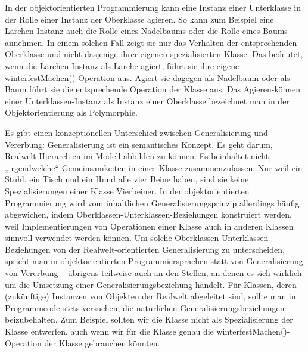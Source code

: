 \vspace{1mm} %

In der objektorientierten Programmierung kann eine Instanz einer Unterklasse in der Rolle einer Instanz der Oberklasse agieren.  So kann zum Beispiel eine Lärchen-Instanz auch die Rolle eines Nadelbaums oder die Rolle eines Baums annehmen. In einem solchen Fall zeigt sie nur das Verhalten der entsprechenden Oberklasse und nicht dasjenige ihrer eigenen spezialisierten Klasse. Das bedeutet, wenn die Lärchen-Instanz als Lärche agiert, führt sie ihre eigene winterfestMachen()-Operation aus. Agiert sie dagegen als Nadelbaum oder als Baum führt sie die entsprechende Operation der Klasse  aus. Das Agieren-können einer Unterklassen-Instanz als Instanz einer Oberklasse bezeichnet man in der Objektorientierung als Polymorphie. 

\vspace{1mm} %

Es gibt einen konzeptionellen Unterschied zwischen Generalisierung und Vererbung: Generalisierung ist ein semantisches Konzept.  Es geht darum, Realwelt-Hierarchien im Modell abbilden zu können. Es beinhaltet nicht, „irgendwelche“ Gemeinsamkeiten in einer Klasse zusammenzufassen. Nur weil ein Stuhl, ein Tisch und ein Hund alle vier Beine haben, sind sie keine Spezialisierungen einer Klasse Vierbeiner. In der objektorientierten Programmierung wird vom inhaltlichen Generalisierungsprinzip allerdings häufig abgewichen, indem Oberklassen-Unterklassen-Beziehungen konstruiert werden, weil Implementierungen von Operationen einer Klasse auch in anderen Klassen sinnvoll verwendet werden können. Um solche Oberklassen-Unterklassen-Beziehungen von der Realwelt-orientierten Generalisierung zu unterscheiden, spricht man in objektorientierten Programmiersprachen statt von Generalisierung von Vererbung -- übrigens teilweise auch an den Stellen, an denen es sich wirklich um die Umsetzung einer Generalisierungsbeziehung handelt. Für Klassen, deren (zukünftige) Instanzen von Objekten der Realwelt abgeleitet sind, sollte man im Programm\-code stets versuchen, die natürlichen Generalisierungs\-beziehungen beizubehalten. Zum Beispiel sollten wir die Klasse  nicht als Spezialisierung der Klasse  entwerfen, auch wenn wir für die Klasse  genau die winterfestMachen()-Operation der Klasse  gebrauchen könnten.

